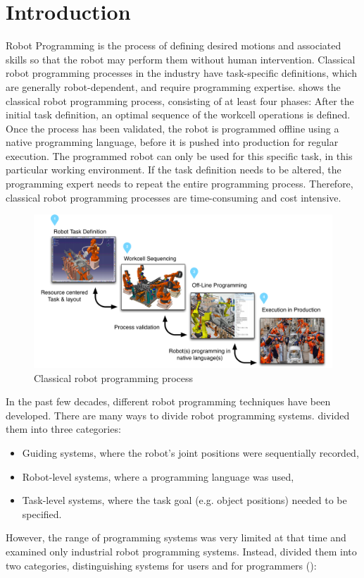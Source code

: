 \section{Introduction}
Robot Programming is the process of defining desired motions and associated skills so that the robot may perform them without human intervention.
Classical robot programming processes in the industry have task-specific definitions, which are generally robot-dependent, and require programming expertise.
 shows the classical robot programming process, consisting of at least four phases:
After the initial task definition, an optimal sequence of the workcell operations is defined.
Once the process has been validated, the robot is programmed offline using a native programming language, before it is pushed into production for regular execution.
The programmed robot can only be used for this specific task, in this particular working environment.
If the task definition needs to be altered, the programming expert needs to repeat the entire programming process.
Therefore, classical robot programming processes are time-consuming and cost intensive.

\begin{figure}[ht]
	\centering
	\includegraphics[width=\linewidth]{figures/manual-programming}
	\caption{Classical robot programming process}
	\label{fig:Classical robot programming process}
\end{figure}

In the past few decades, different robot programming techniques have been developed. 
There are many ways to divide robot programming systems. 
\cite{lozano1983robot} divided them into three categories: 
\begin{itemize}
	\item Guiding systems, where the robot's joint positions were sequentially recorded,
	\item Robot-level systems, where a programming language was used,
	\item Task-level systems, where the task goal (e.g. object positions) needed to be specified.
\end{itemize}
However, the range of programming systems was very limited at that time and examined only industrial robot programming systems.
Instead, \cite{Biggs2003} divided them into two categories, distinguishing systems for users and for programmers ():

